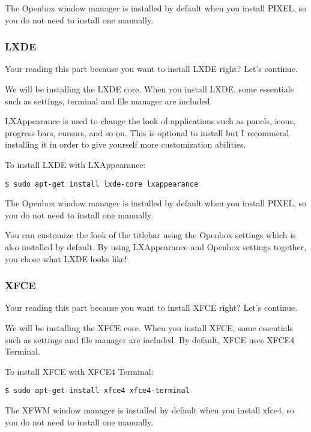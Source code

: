 			The Openbox window manager is installed by default when you install PIXEL, so you do not need to install one manually.
			
		\subsubsection*{LXDE}
			
			Your reading this part because you want to install LXDE right? Let's continue.
			
			We will be installing the LXDE core. When you install LXDE, some essentials such as settings, terminal and file manager are included.
			
			LXAppearance is used to change the look of applications such as panels, icons, progress bars, cursors, and so on. This is optional to install but I recommend installing it in order to give yourself more customization abilities.
			
			To install LXDE with LXAppearance:
\begin{lstlisting}[breaklines=true]
$ sudo apt-get install lxde-core lxappearance
\end{lstlisting}

			The Openbox window manager is installed by default when you install PIXEL, so you do not need to install one manually.
			
			You can customize the look of the titlebar using the Openbox settings which is also installed by default. By using LXAppearance and Openbox settings together, you chose what LXDE looks like!
			
		\subsubsection*{XFCE}
		
			Your reading this part because you want to install XFCE right? Let's continue.
			
			We will be installing the XFCE core. When you install XFCE, some essentials such as settings and file manager are included. By default, XFCE uses XFCE4 Terminal.
			
			To install XFCE with XFCE4 Terminal:
\begin{lstlisting}[breaklines=true]
$ sudo apt-get install xfce4 xfce4-terminal
\end{lstlisting}

			The XFWM window manager is installed by default when you install xfce4, so you do not need to install one manually.
			
